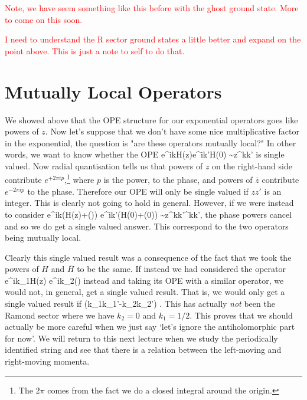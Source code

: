 \textcolor{red}{Note, we have seem something like this before with the ghost ground state. More to come on this soon.}

\br 
    \textcolor{red}{I need to understand the R sector ground states a little better and expand on the point above. This is just a note to self to do that.}
\er 

\section{Mutually Local Operators}

We showed above that the OPE structure for our exponential operators goes like powers of $z$. Now let's suppose that we don't have some nice multiplicative factor in the exponential, the question is "are these operators mutually local?" In other words, we want to know whether the OPE 
\bse 
    e^{ikH(z)}e^{ik'H(0)} \sim z^{kk'}
\ese 
is single valued. Now radial quantisation tells us that powers of $z$ on the right-hand side contribute $e^{+2\pi i p}$,\footnote{The $2\pi$ comes from the fact we do a closed integral around the origin.} where $p$ is the power, to the phase, and powers of $\overline{z}$ contribute $e^{-2\pi ip}$ to the phase. Therefore our OPE will only be single valued if $zz'$ is an integer. This is clearly not going to hold in general. However, if we were instead to consider 
\bse 
    e^{ik\big(H(z)+()\big)} e^{ik'\big(H(0)+(0)\big)} \sim z^{kk'}^{kk'},
\ese 
the phase powers cancel and so we do get a single valued answer. This correspond to the two operators being mutually local. 

Clearly this single valued result was a consequence of the fact that we took the powers of $H$ and $\overline{H}$ to be the same. If instead we had considered the operator 
\bse 
    e^{ik_1H(z)} e^{ik_2()}
\ese 
instead and taking its OPE with a similar operator, we would not, in general, get a single valued result. That is, we would only get a single valued result if 
\be 
\label{eqn:MutuallyLocalKCondition}
    (k_1k_1'-k_2k_2') \in \Z. 
\ee 
This has actually \textit{not} been the Ramond sector where we have $k_2=0$ and $k_1=1/2$. This proves that we should actually be more careful when we just say `let's ignore the antiholomorphic part for now'. We will return to this next lecture when we study the periodically identified string and see that there is a relation between the left-moving and right-moving momenta. 